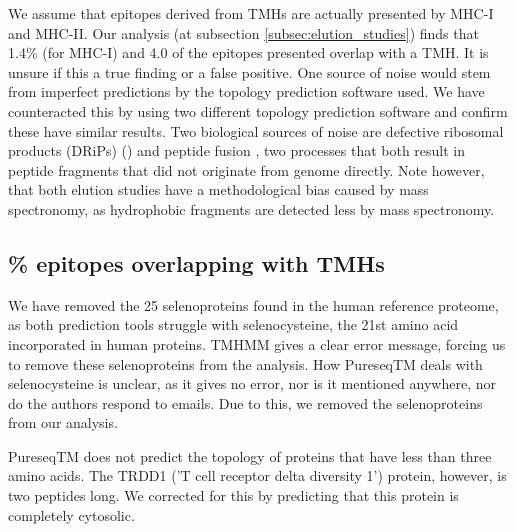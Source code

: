 We assume that epitopes 
derived from TMHs are actually presented by MHC-I and MHC-II.
Our analysis (at subsection \ref{subsec:elution_studies}) 
finds that 1.4\% (for MHC-I) and 4.0%
of the epitopes presented 
overlap with a TMH.
It is unsure if this a true finding or a false positive.
One source of noise would stem from imperfect predictions
by the topology prediction software used. 
We have counteracted this by using two different topology prediction
software and confirm these have similar results.
Two biological sources of noise
are defective ribosomal products (DRiPs) (\cite{yewdell1996defective}) 
and peptide fusion \cite{delong2016pathogenic},
two processes that both result in peptide fragments
that did not originate from genome directly.
Note however, that both elution studies have a
methodological bias caused by mass spectronomy,
as hydrophobic fragments are detected less 
by mass spectronomy.

\subsection{\% epitopes overlapping with TMHs}


We have removed the 25 selenoproteins found in the human
reference proteome, as both prediction tools struggle with 
selenocysteine, the 21st amino acid incorporated in human proteins.
TMHMM gives a clear error message, forcing us to remove
these selenoproteins from the analysis.
How PureseqTM deals with selenocysteine is unclear,
as it gives no error, nor is it mentioned anywhere,
nor do the authors respond to emails. Due to this, we removed the
selenoproteins from our analysis.


PureseqTM does not predict the topology
of proteins that have less than three amino acids. 
The TRDD1 ('T cell receptor delta diversity 1') protein,
however, is two peptides long. 
We corrected for this by predicting that this protein
is completely cytosolic.


